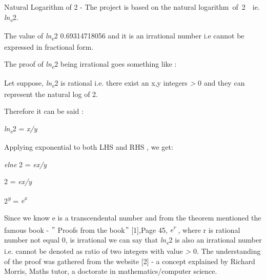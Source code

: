 \documentclass[12pt]{article}
\begin{document}
\vspace{\baselineskip}
\begin{adjustwidth}{0.0in}{0.61in}
Natural Logarithm of 2 - The project is based on the natural logarithm\ of\ 2\ \    ie. \textit{ln\textsubscript{e}}2.\par

\end{adjustwidth}

\begin{adjustwidth}{0.0in}{0.47in}
The value of \textit{ln\textsubscript{e}}2 \tabto{1.93in} 0\textit{.}69314718056 and it is an irrational number i.e cannot be expressed in fractional form.\par

\end{adjustwidth}

\begin{adjustwidth}{0.21in}{0.0in}
The proof of \textit{ln\textsubscript{e}}2 being irrational goes something like :\par

\end{adjustwidth}

\begin{adjustwidth}{0.0in}{0.47in}
Let suppose, \textit{ln\textsubscript{e}}2 is rational i.e. there exist an x,y integers \textit{> }0 and they can represent the natural log of 2.\par

\end{adjustwidth}

Therefore it can be said :\par

\textit{ln\textsubscript{e}}2 = \textit{x/y}\par

Applying exponential to both LHS and RHS , we get:\par

\textit{elne }2 = \textit{ex/y}\par

2 = \textit{ex/y}\par

2\textit{\textsuperscript{y} }= \textit{e\textsuperscript{x}}\par


\vspace{\baselineskip}
\begin{adjustwidth}{0.0in}{0.47in}
Since we know e is a transcendental number and from the theorem mentioned the famous book - $"$ Proofs from the book$"$  [1],Page 45, \textit{e\textsuperscript{r} }, where r is rational number not equal 0, is irrational we can say that \textit{ln\textsubscript{e}}2 is also an irrational number i.e. cannot be denoted as ratio of two integers with value \textit{> }0. The understanding of the proof was gathered from the website [2] - a concept explained by Richard Morris, Maths tutor, a doctorate in mathematics/computer science.\par

\end{adjustwidth}
\end{document}
